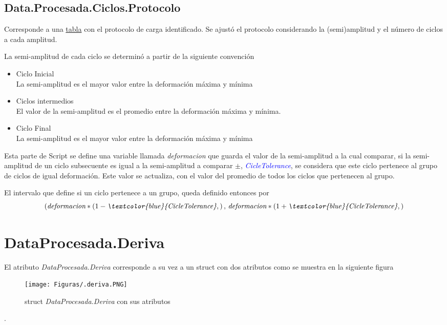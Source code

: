 \documentclass[a4paper, 11pt,article,oneside]{memoir}%
\begin{document}
\section{Data.Procesada.Ciclos.Protocolo}
Corresponde a una \href{https://www.mathworks.com/help/matlab/ref/table.html?searchHighlight=table&s_tid=srchtitle_table_1}{tabla} con el protocolo de carga identificado. Se ajustó el protocolo considerando la (semi)amplitud y el número de ciclos a cada amplitud.\par La semi-amplitud de cada ciclo se determinó a partir de la siguiente convención
\begin{itemize}
    \item Ciclo Inicial \\
    La semi-amplitud es el mayor valor entre la deformación máxima y mínima
    \item  Ciclos intermedios\\
    El valor de la semi-amplitud es el promedio entre la deformación máxima y mínima.
    \item Ciclo Final\\
     La semi-amplitud es el mayor valor entre la deformación máxima y mínima
\end{itemize}
Esta parte de Script
    se define una variable llamada \textit{deformacion} que guarda el valor de la semi-amplitud a la cual comparar, si la semi-amplitud de un ciclo subsecuente es igual a la semi-amplitud a comparar $\pm$,  \textit{\textcolor{blue}{CicleTolerance}}, se considera que este ciclo pertenece al grupo de ciclos de igual deformación. Este valor se  actualiza, con  el valor del promedio de todos los ciclos que pertenecen al grupo.\par
    El intervalo que define si un ciclo pertenece a un grupo, queda definido entonces por
    \begin{equation*}
         (\textit{deformacion}*(1-\textit{\textcolor{blue}{CicleTolerance}},)\, ,\, \textit{deformacion}*(1+\textit{\textcolor{blue}{CicleTolerance}},)
    \end{equation*}
    \newpage
\chapter{DataProcesada.Deriva}
El atributo \textit{DataProcesada.Deriva} corresponde a su vez a un struct con dos atributos como se muestra en la siguiente figura
\begin{figure}[h!]
    \centering
    \texttt{[image: Figuras/.deriva.PNG]}
    \caption{struct \textit{DataProcesada.Deriva} con sus atributos}
    \label{fig:first resumen e3 }
\end{figure}.
\end{document}
